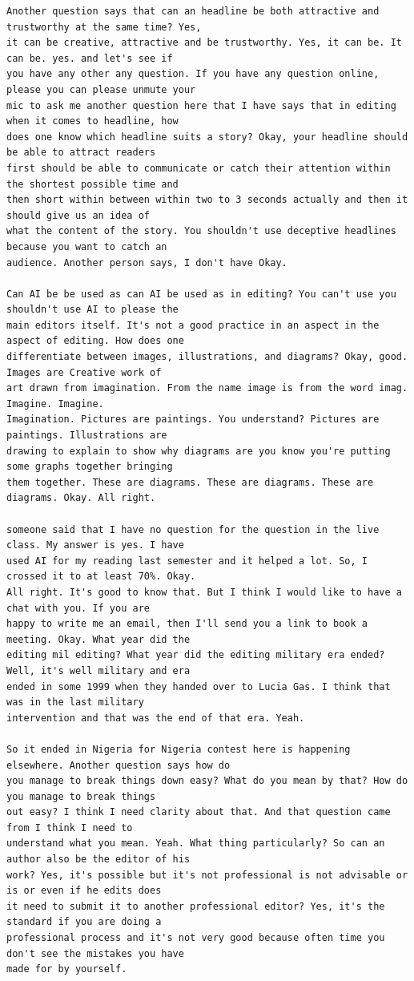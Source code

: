 {\begin{Verbatim}
Another question says that can an headline be both attractive and trustworthy at the same time? Yes,
it can be creative, attractive and be trustworthy. Yes, it can be. It can be. yes. and let's see if
you have any other any question. If you have any question online, please you can please unmute your
mic to ask me another question here that I have says that in editing when it comes to headline, how
does one know which headline suits a story? Okay, your headline should be able to attract readers
first should be able to communicate or catch their attention within the shortest possible time and
then short within between within two to 3 seconds actually and then it should give us an idea of
what the content of the story. You shouldn't use deceptive headlines because you want to catch an
audience. Another person says, I don't have Okay.

Can AI be be used as can AI be used as in editing? You can't use you shouldn't use AI to please the
main editors itself. It's not a good practice in an aspect in the aspect of editing. How does one
differentiate between images, illustrations, and diagrams? Okay, good. Images are Creative work of
art drawn from imagination. From the name image is from the word imag. Imagine. Imagine.
Imagination. Pictures are paintings. You understand? Pictures are paintings. Illustrations are
drawing to explain to show why diagrams are you know you're putting some graphs together bringing
them together. These are diagrams. These are diagrams. These are diagrams. Okay. All right.

someone said that I have no question for the question in the live class. My answer is yes. I have
used AI for my reading last semester and it helped a lot. So, I crossed it to at least 70%. Okay.
All right. It's good to know that. But I think I would like to have a chat with you. If you are
happy to write me an email, then I'll send you a link to book a meeting. Okay. What year did the
editing mil editing? What year did the editing military era ended? Well, it's well military and era
ended in some 1999 when they handed over to Lucia Gas. I think that was in the last military
intervention and that was the end of that era. Yeah.

So it ended in Nigeria for Nigeria contest here is happening elsewhere. Another question says how do
you manage to break things down easy? What do you mean by that? How do you manage to break things
out easy? I think I need clarity about that. And that question came from I think I need to
understand what you mean. Yeah. What thing particularly? So can an author also be the editor of his
work? Yes, it's possible but it's not professional is not advisable or is or even if he edits does
it need to submit it to another professional editor? Yes, it's the standard if you are doing a
professional process and it's not very good because often time you don't see the mistakes you have
made for by yourself.


\end{Verbatim}}
